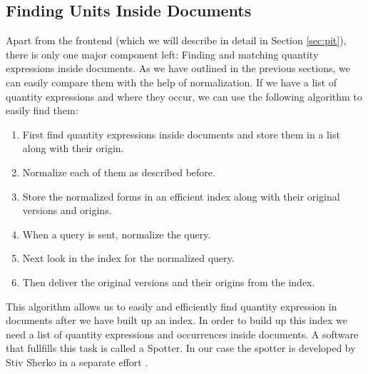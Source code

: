 \subsection{Finding Units Inside Documents}
Apart from the frontend (which we will describe in detail in Section \ref{sec:pit}), there is only one major component left: Finding and matching quantity expressions inside documents. As we have outlined in the previous sections, we can easily compare them with the help of normalization. If we have a list of quantity expressions and where they occur, we can use the following algorithm to easily find them:
\begin{enumerate}
  \item First find quantity expressions inside documents and store them in a list along with their origin.
  \item Normalize each of them as described before.
  \item Store the normalized forms in an efficient index along with their original versions and origins.
  \item When a query is sent, normalize the query.
  \item Next look in the index for the normalized query.
  \item Then deliver the original versions and their origins from the index.
\end{enumerate}
This algorithm allows us to easily and efficiently find quantity expression in documents after we have built up an index. In order to build up this index we need a list of quantity expressions and occurrences inside documents. A software that fullfills this task is called a Spotter. In our case the spotter is developed by Stiv Sherko in a separate effort \cite{thesis:sharko}.
